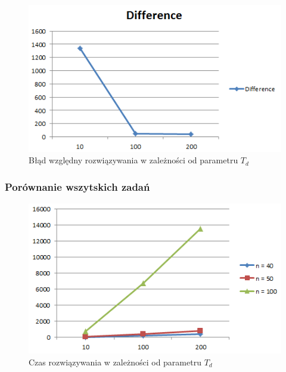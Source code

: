 \documentclass[wide,a4paper,titlepage,12pt] {article}
\begin{document}
\begin{figure}[htbp]
  \begin{center}
         \includegraphics[scale=0.8]{charts/diff100.PNG}
         \caption{Błąd względny rozwiązywania w zależności od parametru $T_d$}
  \end{center}
\end{figure}
\newpage
\subsubsection{Porównanie wszytskich zadań}
\begin{figure}[htbp]
  \begin{center}
         \includegraphics[scale=0.8]{charts/timeAll.PNG}
         \caption{Czas rozwiązywania w zależności od parametru $T_d$}
  \end{center}
\end{figure}
\end{document}
